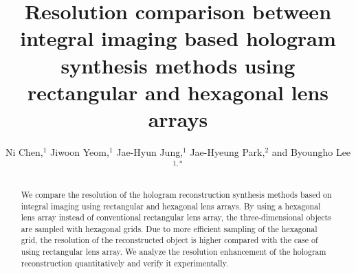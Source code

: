 \documentclass[10pt,letterpaper]{article}
\begin{document}
\graphicspath{{figures/}}

\title{Resolution comparison between integral imaging based hologram synthesis methods using rectangular and hexagonal lens arrays}

\author{Ni Chen,$^{1}$ Jiwoon Yeom,$^{1}$ Jae-Hyun Jung,$^{1}$ Jae-Hyeung Park,$^{2}$ and Byoungho Lee$^{1,*}$}

\address{$^{1}$School of Electrical Engineering, Seoul National University, Gwanak-Gu Gwanakro 1, Seoul 151-744, Korea.}
\address{$^{2}$School of Electrical \& Computer Engineering, Chungbuk National University, 410 SungBong-Ro, Heungduk-Gu Cheongju-Si, Chungbuk, 361-763, Korea.}





\begin{abstract}
We compare the resolution of the hologram reconstruction synthesis methods based on integral imaging using rectangular and hexagonal lens arrays. By using a hexagonal lens array instead of conventional rectangular lens array, the three-dimensional objects are sampled with hexagonal grids. Due to more efficient sampling of the hexagonal grid, the resolution of the reconstructed object is higher compared with the case of using rectangular lens array. We analyze the resolution enhancement of the hologram reconstruction quantitatively and verify it experimentally.
\end{abstract}





\end{document}
